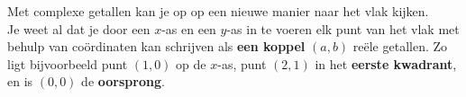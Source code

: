 \documentclass{ximera}
\begin{document}
	\author{Zomercursus KU Leuven}
	
	\label{xim:complexe_getallen_meetkundif}




Met complexe getallen kan je op op een nieuwe manier naar het vlak kijken. 
\\
Je weet al dat je door een $x$-as en een $y$-as in te voeren 
elk punt van het vlak met behulp van coördinaten kan schrijven als \textbf{een koppel} \((a,b)\) reële getallen.
Zo ligt bijvoorbeeld punt \((1,0)\) op de $x$-as, punt \((2,1)\) in het \textbf{eerste kwadrant}, en is \((0,0)\) de \textbf{oorsprong}.



\end{document}

